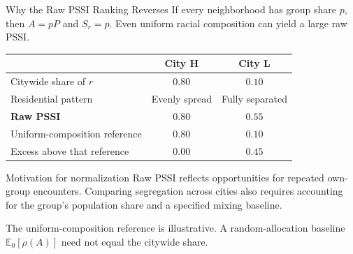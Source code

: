 \documentclass{beamer}
\begin{document}
\begin{frame}{Why the Raw PSSI Ranking Reverses}
\small
If every neighborhood has group share $p$, then $A=pP$ and
$S_r=p$. Even uniform racial composition can yield a large raw PSSI.
\begin{center}
\renewcommand{\arraystretch}{1.15}
\begin{tabular}{lcc}
 & \textbf{City H} & \textbf{City L} \\
\hline
Citywide share of $r$ & $0.80$ & $0.10$ \\
Residential pattern & Evenly spread & Fully separated \\
\textbf{Raw PSSI} & $\mathbf{0.80}$ & $\mathbf{0.55}$ \\
Uniform-composition reference & $0.80$ & $0.10$ \\
Excess above that reference & $0.00$ & $0.45$ \\
\hline
\end{tabular}
\end{center}
\begin{block}{Motivation for normalization}
Raw PSSI reflects opportunities for repeated own-group encounters.
Comparing segregation across cities also requires accounting for
the group's population share and a specified mixing baseline.
\end{block}
{\footnotesize The uniform-composition reference is illustrative.
A random-allocation baseline $\mathbb{E}_0[\rho(A)]$ need not equal the
citywide share.}
\end{frame}
\end{document}
